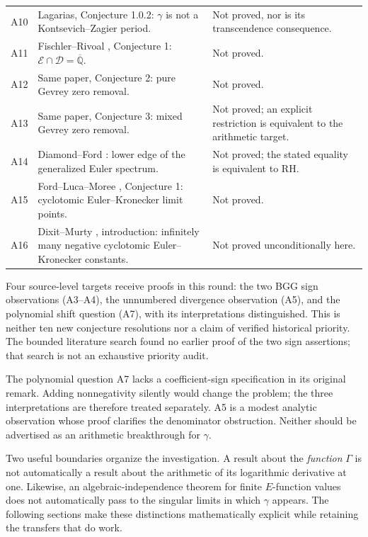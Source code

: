 \documentclass[11pt,a4paper]{article}
\theoremstyle{definition}
\theoremstyle{remark}
\newcommand{\Qbar}{\overline{\mathbb Q}}
\numberwithin{equation}{section}
\begin{document}
\begin{longtable}{@{}p{}p{}p{}@{}}
A10&Lagarias, Conjecture 1.0.2: $\gamma$ is not a Kontsevich--Zagier period.&Not proved, nor is its transcendence consequence.\\
A11&Fischler--Rivoal \cite{p1:FischlerRivoal2024}, Conjecture 1: $\mathcal E\cap\mathcal D=\Qbar$.&Not proved.\\
A12&Same paper, Conjecture 2: pure Gevrey zero removal.&Not proved.\\
A13&Same paper, Conjecture 3: mixed Gevrey zero removal.&Not proved; an explicit restriction is equivalent to the arithmetic target.\\
A14&Diamond--Ford \cite{p1:DiamondFord2008}: lower edge of the generalized Euler spectrum.&Not proved; the stated equality is equivalent to RH.\\
A15&Ford--Luca--Moree \cite{p1:FordLucaMoree2014}, Conjecture 1: cyclotomic Euler--Kronecker limit points.&Not proved.\\
A16&Dixit--Murty \cite{p1:DixitMurty2023}, introduction: infinitely many negative cyclotomic Euler--Kronecker constants.&Not proved unconditionally here.\\
\bottomrule
\end{longtable}
\normalsize

Four source-level targets receive proofs in this round: the two BGG sign
observations (A3--A4), the unnumbered divergence observation (A5), and the
polynomial shift question (A7), with its interpretations distinguished.
This is neither ten new conjecture resolutions nor a claim of verified
historical priority. The bounded literature search found no earlier proof
of the two sign assertions; that search is not an exhaustive priority audit.

The polynomial question A7 lacks a coefficient-sign specification in its
original remark. Adding nonnegativity silently would change the problem; the
three interpretations are therefore treated separately. A5 is a modest
analytic observation whose proof clarifies the denominator obstruction. Neither
should be advertised as an arithmetic breakthrough for $\gamma$.

Two useful boundaries organize the investigation. A result about the
\emph{function} $\Gamma$ is not automatically a result about the arithmetic
of its logarithmic derivative at one. Likewise, an algebraic-independence
theorem for finite $E$-function values does not automatically pass to the
singular limits in which $\gamma$ appears. The following sections make these
distinctions mathematically explicit while retaining the transfers that do work.
\end{document}
